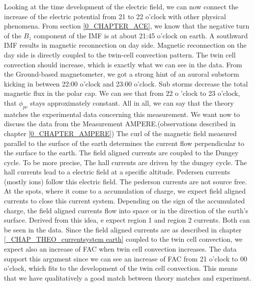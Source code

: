 \documentclass[10pt,a4paper]{article}
\begin{document}
Looking at the time development of the electric field, we can now connect the increase of the electric potential from 21 to 22 o'clock with other physical phenomena. 
From section \ref{0_CHAPTER_ACE}, we know that the negative turn of the $B_z$ component of the IMF is at about 21:45 o'clock on earth. A southward IMF results in magnetic reconnection on day side. Magnetic reconnection on the day side is directly coupled to the twin-cell convection pattern. The twin cell convection should increase, which is exactly what we can see in the data. From the Ground-based magnetometer, we got a strong  hint of an auroral substorm kicking in between 22:00 o'clock and 
23:00 o'clock. Sub storms decrease the total magnetic flux in the polar cap. We can see that from 22 o 'clock to 23 o'clock, that $\phi_{pc}$ stays approximately constant.
All in all, we can say that the theory matches the experimental data concerning this measurement. 
We want now to discuss the data from the Measurement AMPERE.(observations described in chapter \ref{0_CHAPTER_AMPERE}) The  curl of the magnetic field measured parallel 
to the surface of the earth determines the current flow perpendicular to the surface to the earth. The field aligned currents are coupled to the Dungey cycle. To be more precise, The hall currents are driven by the dungey cycle. The hall currents lead to a electric field at a specific altitude. Pedersen currents (mostly ions) follow this electric field. The pederson currents are not source free. At the spots, where it come to a accumulation of charge, we expect field aligned currents to close this current system. Depending on the sign of the accumulated charge, the field aligned currents flow into space or in the direction of the earth's surface. 
Derived from this idea, e expect region 1 and region 2 currents. Both can be seen in the data. Since the field aligned currents are as described in chapter \ref{_CHAP_THEO_currentsystem earth} coupled to the twin cell convection, we expect also an increase of FAC when twin cell convection increases. The data support this argument since we can see an increase of FAC from 21 o'clock to 00 o'clock, which fits to the development of the twin cell convection. 
This means that we have qualitatively a good match between theory matches and experiment.
\end{document}

